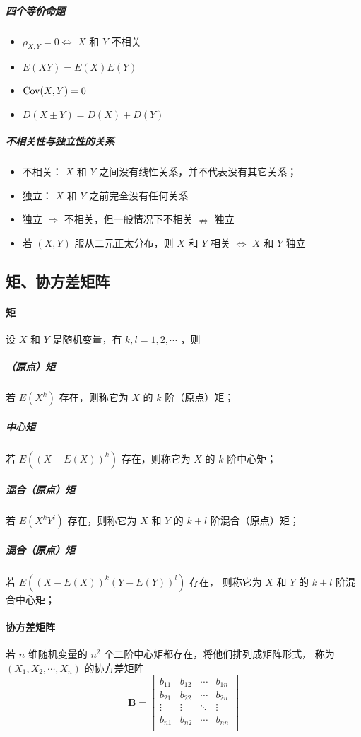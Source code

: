 \subparagraph{四个等价命题}
\begin{itemize}[leftmargin=\subparitemindent]
    \item $ \rho_{X,Y} = 0 \Leftrightarrow $ $ X $ 和 $ Y $ 不相关
    \item $ E(XY) = E(X)E(Y) $
    \item $ \mathrm{Cov}(X,Y) = 0 $
    \item $ D(X \pm Y) = D(X) + D(Y) $
\end{itemize}

\subparagraph{不相关性与独立性的关系}
\begin{itemize}[leftmargin=\subparitemindent]
    \item 不相关： $ X $ 和 $ Y $ 之间没有线性关系，并不代表没有其它关系；
    \item 独立： $ X $ 和 $ Y $ 之前完全没有任何关系
    \item 独立 $ \Rightarrow $ 不相关，但一般情况下不相关 $ \nRightarrow $ 独立
    \item 若 $ (X,Y) $ 服从二元正太分布，则 $ X $ 和 $ Y $ 相关 $ \Leftrightarrow $  $ X $ 和 $ Y $  独立
\end{itemize}

\subsection{矩、协方差矩阵}

\paragraph{矩} 设 $ X $ 和 $ Y $ 是随机变量，有 $ k,l = 1,2,\cdots $ ，则

\subparagraph{（原点）矩} 若 $ E(X^k) $ 存在，则称它为 $ X $ 的 $ k $ 阶（原点）矩；
\subparagraph{中心矩} 若 $ E((X - E(X))^k) $ 存在，则称它为  $ X $ 的 $ k $ 阶中心矩；
\subparagraph{混合（原点）矩} 若 $ E(X^kY^l) $ 存在，则称它为 $ X $ 和 $ Y $ 的 $ k+l $ 阶混合（原点）矩；
\subparagraph{混合（原点）矩} 若 $ E((X - E(X))^k (Y - E(Y))^l) $ 存在，
则称它为 $ X $ 和 $ Y $ 的 $ k+l $ 阶混合中心矩；

\paragraph{协方差矩阵} 若 $ n $ 维随机变量的 $ n^2 $ 个二阶中心矩都存在，将他们排列成矩阵形式，
称为 $ (X_1, X_2, \cdots, X_n) $ 的协方差矩阵
\begin{equation}
    \symbf{B} = \begin{bmatrix}
        b_{11} & b_{12} & \cdots & b_{1n} \\
        b_{21} & b_{22} & \cdots & b_{2n} \\
        \vdots & \vdots & \ddots & \vdots \\
        b_{n1} & b_{n2} & \cdots & b_{nn} \\
    \end{bmatrix}
\end{equation}

